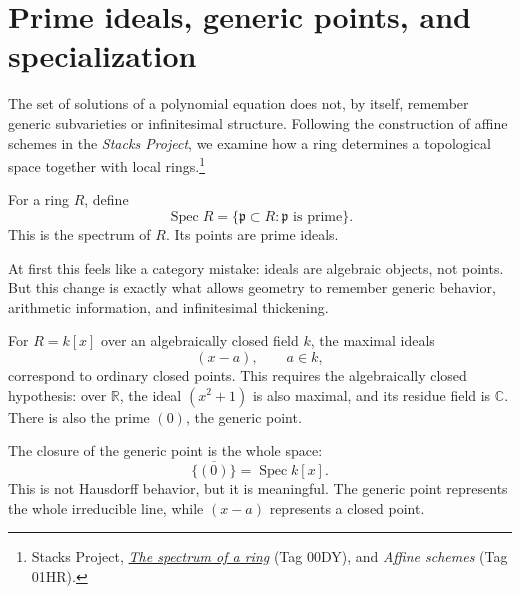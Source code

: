 
\section{Prime ideals, generic points, and specialization}

The set of solutions of a polynomial equation does not, by itself, remember generic subvarieties or infinitesimal structure. Following the construction of affine schemes in the \emph{Stacks Project}, we examine how a ring determines a topological space together with local rings.\footnote{Stacks Project, \href{https://stacks.math.columbia.edu/tag/00DY}{\emph{The spectrum of a ring}} (Tag 00DY), and \emph{Affine schemes} (Tag 01HR).}

For a ring \(R\), define
\[
  \operatorname{Spec}R=\{\mathfrak p\subset R:\mathfrak p\text{ is prime}\}.
\]
This is the spectrum of \(R\). Its points are prime ideals.

At first this feels like a category mistake: ideals are algebraic objects, not points. But this change is exactly what allows geometry to remember generic behavior, arithmetic information, and infinitesimal thickening.

For \(R=k[x]\) over an algebraically closed field \(k\), the maximal ideals
\[
  (x-a),\qquad a\in k,
\]
correspond to ordinary closed points. This requires the algebraically closed hypothesis: over \(\mathbb R\), the ideal \((x^2+1)\) is also maximal, and its residue field is \(\mathbb C\). There is also the prime \((0)\), the generic point.

The closure of the generic point is the whole space:
\[
  \overline{\{(0)\}}=\operatorname{Spec}k[x].
\]
This is not Hausdorff behavior, but it is meaningful. The generic point represents the whole irreducible line, while \((x-a)\) represents a closed point.

\begin{center}
\end{center}

